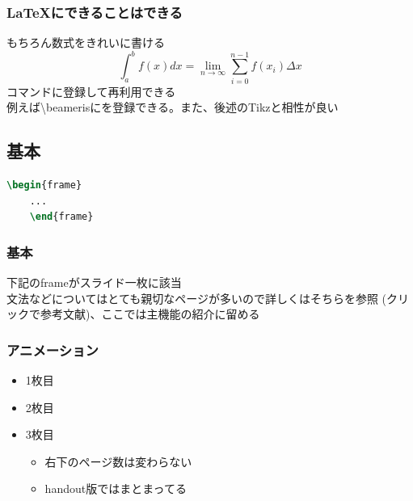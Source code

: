 \begin{frame}
  \frametitle{ \LaTeX にできることはできる}
  もちろん数式をきれいに書ける 
  \begin{displaymath}
      \int^{b}_{a} f(x) dx = \lim_{n \to \infty} \sum^{n-1}_{i=0} f(x_{i}) \Delta x
  \end{displaymath}
  コマンドに登録して再利用できる\\
    例えば\textbackslash beamerisに\small{\textcolor{blue!35}{\beameris}}を登録できる。また、後述のTikzと相性が良い
\end{frame}

\subsection{基本}
\begin{lrbox}{\codebox}
    \begin{lstlisting}[language=TeX]
    \begin{frame}
    ...
    \end{frame}
    \end{lstlisting}
\end{lrbox}

\begin{frame}[fragile]
  \frametitle{基本}
  下記のframeがスライド一枚に該当\\
  \medskip
  \usebox{\codebox}
  \bigskip
  文法などについてはとても親切なページが多いので詳しくはそちらを参照 \cite{BeamerT10:online} \cite{Beamer読本73:online} (クリックで参考文献)、ここでは主機能の紹介に留める
\end{frame}


\begin{frame}{}
  \frametitle{アニメーション}
  \begin{itemize}
    \item 1枚目
    \item 2枚目
    \item 3枚目
      \begin{itemize}
        \item 右下のページ数は変わらない
        \item handout版ではまとまってる
      \end{itemize}
  \end{itemize}
\end{frame}

